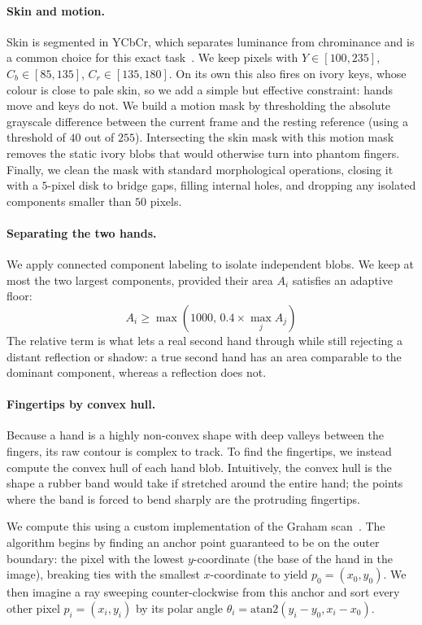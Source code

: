 \documentclass[11pt]{article}
\begin{document}
\paragraph{Skin and motion.}
Skin is segmented in YCbCr, which separates luminance from chrominance and is a
common choice for this exact task~\cite{benabdelkader2005ycbcr}. We keep pixels
with $Y\in[100,235]$, $C_b\in[85,135]$, $C_r\in[135,180]$. On its own this also
fires on ivory keys, whose colour is close to pale skin, so we add a simple but
effective constraint: hands move and keys do not. We build a motion mask by thresholding 
the absolute grayscale difference between the current frame and the resting reference 
(using a threshold of $40$ out of $255$). Intersecting the skin mask with this motion 
mask removes the static ivory blobs that would otherwise turn into phantom fingers. 
Finally, we clean the mask with standard morphological operations, closing it with a 
$5$-pixel disk to bridge gaps, filling internal holes, and dropping any isolated 
components smaller than $50$ pixels.

\paragraph{Separating the two hands.}
We apply connected component labeling to isolate independent blobs. We keep at most 
the two largest components, provided their area $A_i$ satisfies an adaptive floor:
\begin{equation}
    A_i \geq \max\left(1000,\, 0.4 \times \max_j A_j\right)
\end{equation}
The relative term is what lets a real second hand through while still rejecting a 
distant reflection or shadow: a true second hand has an area comparable to the 
dominant component, whereas a reflection does not.

\paragraph{Fingertips by convex hull.}
Because a hand is a highly non-convex shape with deep valleys between the fingers, 
its raw contour is complex to track. To find the fingertips, we instead compute the 
convex hull of each hand blob. Intuitively, the convex hull is the shape a rubber 
band would take if stretched around the entire hand; the points where the band is 
forced to bend sharply are the protruding fingertips. 

We compute this using a custom implementation of the Graham scan~\cite{graham1972convexhull}. 
The algorithm begins by finding an anchor point guaranteed to be on the outer boundary: 
the pixel with the lowest $y$-coordinate (the base of the hand in the image), breaking 
ties with the smallest $x$-coordinate to yield $p_0 = (x_0, y_0)$. We then imagine a ray 
sweeping counter-clockwise from this anchor and sort every other pixel $p_i = (x_i, y_i)$ 
by its polar angle $\theta_i = \text{atan2}(y_i - y_0, x_i - x_0)$.
\end{document}
